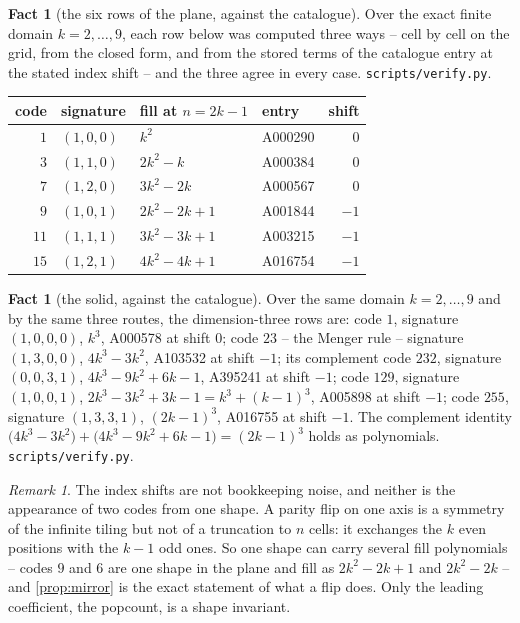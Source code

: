 \documentclass[11pt]{amsart}
\theoremstyle{definition}
\newtheorem{fact}[theorem]{Fact}
\theoremstyle{remark}
\newtheorem{remark}[theorem]{Remark}
\begin{document}
\begin{fact}[the six rows of the plane, against the catalogue]
\label{fact:six}
Over the exact finite domain $k = 2,\dots,9$, each row below was computed three ways -- cell by cell on the grid, from the closed form, and from the stored terms of the catalogue entry at the stated index shift -- and the three agree in every case. \texttt{scripts/\allowbreak verify.py}.
\begin{center}
\begin{tabular}{rlllr}
\toprule
code & signature & fill at $n = 2k-1$ & entry & shift\\
\midrule
$1$  & $(1,0,0)$ & $k^{2}$          & A000290 & $0$\\
$3$  & $(1,1,0)$ & $2k^{2}-k$       & A000384 & $0$\\
$7$  & $(1,2,0)$ & $3k^{2}-2k$      & A000567 & $0$\\
$9$  & $(1,0,1)$ & $2k^{2}-2k+1$    & A001844 & $-1$\\
$11$ & $(1,1,1)$ & $3k^{2}-3k+1$    & A003215 & $-1$\\
$15$ & $(1,2,1)$ & $4k^{2}-4k+1$    & A016754 & $-1$\\
\bottomrule
\end{tabular}
\end{center}
\end{fact}

\begin{fact}[the solid, against the catalogue]
\label{fact:solid}
Over the same domain $k = 2,\dots,9$ and by the same three routes, the dimension-three rows are: code $1$, signature $(1,0,0,0)$, $k^{3}$, A000578 at shift $0$; code $23$ -- the Menger rule -- signature $(1,3,0,0)$, $4k^{3}-3k^{2}$, A103532 at shift $-1$; its complement code $232$, signature $(0,0,3,1)$, $4k^{3}-9k^{2}+6k-1$, A395241 \cite{a395241} at shift $-1$; code $129$, signature $(1,0,0,1)$, $2k^{3}-3k^{2}+3k-1 = k^{3}+(k-1)^{3}$, A005898 at shift $-1$; code $255$, signature $(1,3,3,1)$, $(2k-1)^{3}$, A016755 at shift $-1$. The complement identity $\bigl(4k^{3}-3k^{2}\bigr)+\bigl(4k^{3}-9k^{2}+6k-1\bigr) = (2k-1)^{3}$ holds as polynomials. \texttt{scripts/\allowbreak verify.py}.
\end{fact}

\begin{remark}
\label{rem:truncation}
The index shifts are not bookkeeping noise, and neither is the appearance of two codes from one shape. A parity flip on one axis is a symmetry of the infinite tiling but not of a truncation to $n$ cells: it exchanges the $k$ even positions with the $k-1$ odd ones. So one shape can carry several fill polynomials -- codes $9$ and $6$ are one shape in the plane and fill as $2k^{2}-2k+1$ and $2k^{2}-2k$ -- and \cref{prop:mirror} is the exact statement of what a flip does. Only the leading coefficient, the popcount, is a shape invariant.
\end{remark}
\end{document}
